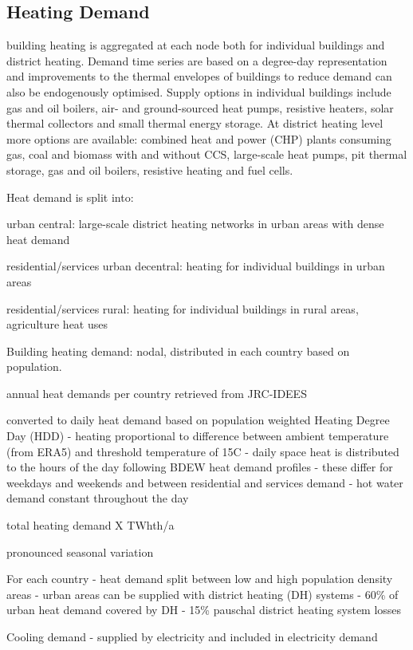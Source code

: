 \subsection{Heating Demand}

building heating is aggregated at each node both for individual buildings and district heating.
Demand time series are based on a degree-day representation and improvements to
the thermal envelopes of buildings to reduce demand can also be endogenously
optimised. Supply options in individual buildings include gas and oil boilers,
air- and ground-sourced heat pumps, resistive heaters, solar thermal collectors
and small thermal energy storage. At district heating level more options are
available: combined heat and power (CHP) plants consuming gas, coal and biomass
with and without CCS, large-scale heat pumps, pit thermal storage, gas and oil
boilers, resistive heating and fuel cells.

Heat demand is split into:

urban central: large-scale district heating networks in urban areas with dense
heat demand

residential/services urban decentral: heating for individual buildings in urban
areas

residential/services rural: heating for individual buildings in rural areas,
agriculture heat uses

Building heating demand: nodal, distributed in each country based on population.

annual heat demands per country retrieved from JRC-IDEES

converted to daily heat demand based on population weighted Heating Degree Day (HDD)
- heating proportional to difference between ambient temperature (from ERA5) and threshold temperature of 15\deg{}C
- daily space heat is distributed to the hours of the day following BDEW heat demand profiles
- these differ for weekdays and weekends and between residential and services demand
- hot water demand constant throughout the day

total heating demand X TWhth/a

pronounced seasonal variation

For each country
- heat demand split between low and high population density areas
- urban areas can be supplied with district heating (DH) systems
- 60\% of urban heat demand covered by DH
- 15\% pauschal district heating system losses

Cooling demand
- supplied by electricity and included in electricity demand

